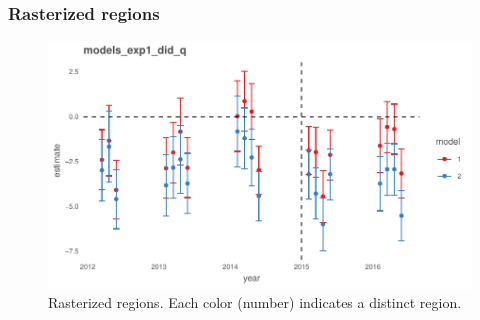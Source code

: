 \documentclass[9pttwoside,lineno]{pnas-new}
\begin{document}
\hypertarget{rasterized-regions}{%
\subsubsection{Rasterized regions}\label{rasterized-regions}}

\begin{figure}
\centering
\includegraphics{Manuscript_files/figure-latex/unnamed-chunk-31-1.pdf}
\caption{\label{fig:raster_rgn}Rasterized regions. Each color (number) indicates a distinct region.}
\end{figure}
%
%
%
\end{document}
